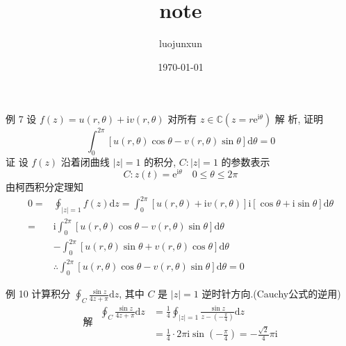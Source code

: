 \documentclass[12pt, a4paper, oneside]{ctexart}
\title{\huge\textbf{note}}
\author{luojunxun}
\date{\today}
\begin{document}
\maketitle
\begin{center}
例 7 设 $f(z)=u(r, \theta)+\mathrm{i} v(r, \theta)$ 对所有 $z \in \mathbb{C}\left(z=r \mathrm{e}^{\mathrm{i} \theta}\right)$ 解 析, 证明
$$
\int_0^{2 \pi}[u(r, \theta) \cos \theta-v(r, \theta) \sin \theta] \mathrm{d} \theta=0
$$
证 设 $f(z)$ 沿着闭曲线 $|z|=1$ 的积分, $C:|z|=1$ 的参数表示
$$
C: z(t)=\mathrm{e}^{\mathrm{i} \theta} \quad 0 \leqslant \theta \leqslant 2 \pi
$$
由柯西积分定理知
$$
\begin{aligned}
0= & \oint_{|z|=1} f(z) \mathrm{d} z=\int_0^{2 \pi}[u(r, \theta)+\mathrm{i} v(r, \theta)] \mathrm{i}[\cos \theta+\mathrm{i} \sin \theta] \mathrm{d} \theta \\
= & \mathrm{i} \int_0^{2 \pi}[u(r, \theta) \cos \theta-v(r, \theta) \sin \theta] \mathrm{d} \theta \\
& -\int_0^{2 \pi}[u(r, \theta) \sin \theta+v(r, \theta) \cos \theta] \mathrm{d} \theta \\
& \therefore \int_0^{2 \pi}[u(r, \theta) \cos \theta-v(r, \theta) \sin \theta] \mathrm{d} \theta=0
\end{aligned}
$$
\end{center}
\vspace*{15pt}

\begin{center}
    例 10 计算积分 $\oint_C \frac{\sin z}{4 z+\pi} \mathrm{d} z$, 其中 $C$ 是 $|z|=1$ 逆时针方向.(Cauchy公式的逆用)
$$
\text { 解 } \begin{aligned}
\oint_C \frac{\sin z}{4 z+\pi} \mathrm{d} z & =\frac{1}{4} \oint_{|z|=1} \frac{\sin z}{z-\left(-\frac{\pi}{4}\right)} \mathrm{d} z \\
& =\frac{1}{4} \cdot 2 \pi \mathrm{i} \sin \left(-\frac{\pi}{4}\right)=-\frac{\sqrt{2}}{4} \pi \mathrm{i}
\end{aligned}
$$
\end{center}
\end{document}
